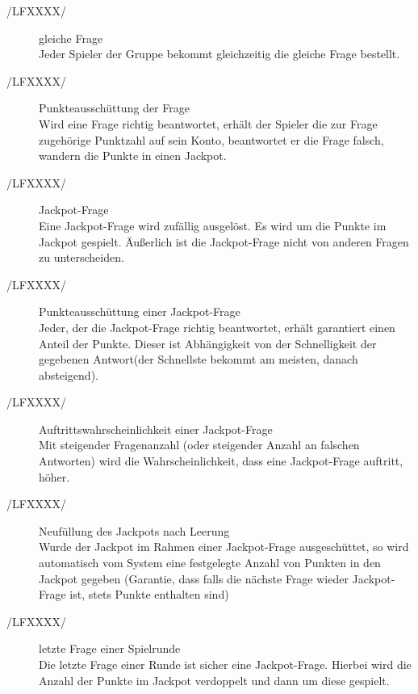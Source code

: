 \documentclass[11pt,a4paper]{scrreprt}
\begin{document}
\begin{description}
\item[/LFXXXX/]gleiche Frage \\
 Jeder Spieler der Gruppe bekommt gleichzeitig die gleiche Frage bestellt.
\item[/LFXXXX/]Punkteausschüttung der Frage \\
Wird eine Frage richtig beantwortet, erhält der Spieler die zur Frage zugehörige Punktzahl auf sein Konto,  beantwortet er die Frage falsch, wandern die Punkte in einen Jackpot.
\item[/LFXXXX/]Jackpot-Frage \\
Eine Jackpot-Frage wird zufällig ausgelöst. Es wird um die Punkte im Jackpot gespielt. Äußerlich ist die Jackpot-Frage nicht von anderen Fragen zu unterscheiden.
\item[/LFXXXX/] Punkteausschüttung einer Jackpot-Frage \\
Jeder, der die Jackpot-Frage richtig beantwortet, erhält garantiert einen Anteil der Punkte. Dieser ist Abhängigkeit von der Schnelligkeit der gegebenen Antwort(der Schnellste bekommt am meisten, danach absteigend).
\item[/LFXXXX/] Auftrittswahrscheinlichkeit einer Jackpot-Frage \\
 Mit steigender Fragenanzahl (oder steigender Anzahl an falschen Antworten) wird die Wahrscheinlichkeit, dass eine Jackpot-Frage auftritt, höher.
\item[/LFXXXX/] Neufüllung des Jackpots nach Leerung \\
Wurde der Jackpot im Rahmen einer Jackpot-Frage ausgeschüttet, so wird automatisch vom System eine festgelegte Anzahl von Punkten in den Jackpot gegeben (Garantie, dass falls die nächste Frage wieder Jackpot-Frage ist, stets Punkte enthalten sind)
\item[/LFXXXX/]letzte Frage einer Spielrunde \\
Die letzte Frage einer Runde ist sicher eine Jackpot-Frage. Hierbei wird die Anzahl der Punkte im Jackpot verdoppelt und dann um diese gespielt.
\end{description}
\end{document}
